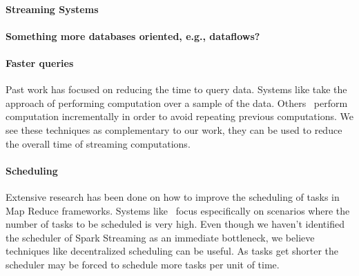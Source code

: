
\paragraph {\bf Streaming Systems} 

\paragraph {\bf Something more databases oriented, e.g., dataflows?}

\paragraph {\bf Faster queries} Past work
has focused on reducing the time to query data. Systems like \cite{BlinkDB, OnlineAggregation} take the approach of performing computation over a sample of the data.
Others~\cite{Incoop} perform computation incrementally in order to avoid repeating previous computations. 
We see these techniques as complementary to our work, they can be used to reduce the overall time of streaming computations.

\paragraph {\bf Scheduling} Extensive research has been done on how to improve the scheduling of tasks in Map Reduce frameworks. 
Systems like~\cite{Sparrow} focus especifically on scenarios where the number of tasks to be scheduled is very high.
Even though we haven't identified the scheduler of Spark Streaming as an immediate bottleneck,
we believe techniques like decentralized scheduling can be useful.
As tasks get shorter the scheduler may be forced to schedule more tasks per unit of time.
